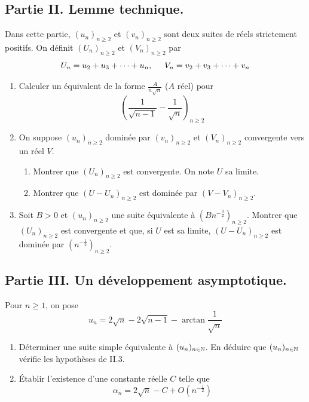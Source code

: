 \subsection*{Partie II. Lemme technique.}
Dans cette partie, $(u_n)_{n\geq 2}$ et $(v_n)_{n\geq 2}$ sont deux suites de r{\'e}els strictement positifs. On d{\'e}finit $(U_n)_{n\geq 2}$ et $(V_n)_{n\geq 2}$ par
\begin{displaymath}
 U_n =u_2+u_3+\cdots+u_n,\hspace{0.5cm} V_n =v_2+v_3+\cdots+v_n  
\end{displaymath}
\begin{enumerate}
\item Calculer un {\'e}quivalent de la forme $\frac{A}{n\sqrt{n}}$ ($A$ r{\'e}el) pour
\[\left(\frac{1}{\sqrt{n-1}}-\frac{1}{\sqrt{n}}\right)_{n\geq 2}\]
\item
On suppose $(u_n)_{n\geq 2}$ domin{\'e}e par $(v_n)_{n\geq 2}$ et $(V_n)_{n\geq 2}$ convergente vers un réel $V$.
\begin{enumerate}
\item Montrer que $(U_n)_{n\geq 2}$ est convergente. On note $U$ sa limite.
\item Montrer que $(U-U_n)_{n\geq 2}$ est domin{\'e}e par $(V-V_n)_{n\geq 2}$.
\end{enumerate}
\item Soit $B>0$ et $(u_n)_{n\geq 2}$ une suite {\'e}quivalente {\`a} $(Bn^{-\frac{3}{2}})_{n\geq 2}$. Montrer que $(U_n)_{n\geq 2}$ est convergente et que, si $U$ est sa limite, $(U-U_n)_{n\geq 2}$ est domin{\'e}e par $(n^{-\frac{1}{2}})_{n\geq 2}$.
\end{enumerate}

\subsection*{Partie III. Un développement asymptotique.}
Pour $n\geq1$, on pose
\begin{displaymath}
  u_n=2\sqrt n-2\sqrt {n-1}-\arctan \frac{1} {\sqrt n}
\end{displaymath}
\begin{enumerate}
\item Déterminer une suite simple {\'e}quivalente {\`a} $(u_n)_{n\in \mathbb{N}}$. En déduire que $(u_n)_{n\in \mathbb{N}}$ v{\'e}rifie les hypoth{\`e}ses de II.3.
\item \'Etablir l'existence d'une constante r{\'e}elle $C$ telle que
\begin{displaymath}
  \alpha_n=2\sqrt n-C+O(n^{-\frac{1}{2}})
\end{displaymath}
\end{enumerate}

